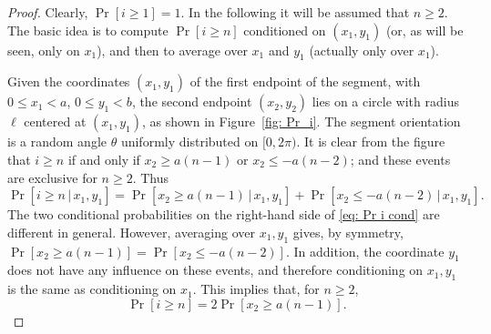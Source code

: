 \documentclass[12pt, a4paper]{article}
\newcommand{\cond}{\,|\,} %
\newcommand{\len}{\ell} %
\begin{document}
\begin{proof}
Clearly, $\Pr[i \geq 1]=1$. In the following it will be assumed that $n \geq 2$. The basic idea is to compute $\Pr[i \geq n]$ conditioned on $(x_1,y_1)$ (or, as will be seen, only on $x_1$), and then to average over $x_1$ and $y_1$ (actually only over $x_1$).

Given the coordinates $(x_1, y_1)$ of the first endpoint of the segment, with $0 \leq x_1 < a$, $0 \leq y_1 < b$, the second endpoint $(x_2, y_2)$ lies on a circle with radius $\len$ centered at $(x_1,y_1)$, as shown in Figure~\ref{fig: Pr_i}. The segment orientation is a random angle $\theta$ uniformly distributed on $[0,2\pi)$. It is clear from the figure that $i \geq n$ if and only if $x_2 \geq a(n-1)$ or $x_2 \leq -a(n-2)$; and these events are exclusive for $n \geq 2$. Thus
\begin{equation}
\label{eq: Pr i cond}
\Pr[i \geq n \cond x_1, y_1] = \Pr[x_2 \geq a(n-1) \cond x_1, y_1] + \Pr[x_2 \leq -a(n-2) \cond x_1, y_1].
\end{equation}
The two conditional probabilities on the right-hand side of \eqref{eq: Pr i cond} are different in general. However, averaging over $x_1, y_1$ gives, by symmetry, $\Pr[x_2 \geq a(n-1)] = \Pr[x_2 \leq -a(n-2)]$. In addition, the coordinate $y_1$ does not have any influence on these events, and therefore conditioning on $x_1, y_1$ is the same as conditioning on $x_1$. This implies that, for $n \geq 2$,
\begin{equation}
\label{eq: Pr i = 2 Pr}
\Pr[i \geq n] = 2 \Pr[x_2 \geq a(n-1)].
\end{equation}


\end{proof}
\end{document}

